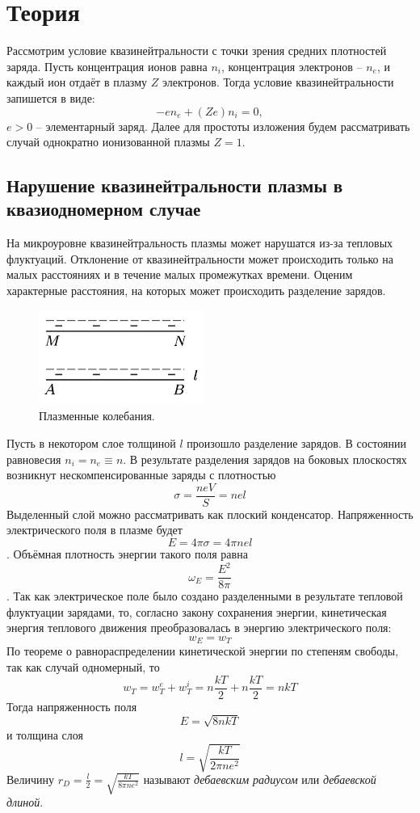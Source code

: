 \section*{Теория}

Рассмотрим условие квазинейтральности с точки зрения средних плотностей заряда. Пусть концентрация ионов равна $n_i$, концентрация электронов -- $n_e$, и каждый ион отдаёт в плазму $Z$ электронов. Тогда условие квазинейтральности запишется в виде:
$$
-en_e + (Ze) n_i = 0, 
$$
$e > 0$ -- элементарный заряд. Далее для простоты изложения будем рассматривать случай однократно ионизованной плазмы $Z = 1$.

\subsection*{Нарушение квазинейтральности плазмы в квазиодномерном случае}

На микроуровне квазинейтральность плазмы может нарушатся из-за тепловых флуктуаций. Отклонение от квазинейтральности может происходить только на малых расстояниях и в течение малых промежутках времени. Оценим характерные расстояния, на которых может происходить разделение зарядов.

\begin{figure}
	\vspace{-10pt}
	\centering
	\includegraphics[width=0.48\textwidth]{../res/plasma.png}
	\caption{Плазменные колебания.}
	\label{img:plasma oscil}
\end{figure}

Пусть в некотором слое толщиной $l$ произошло разделение зарядов. В состоянии равновесия $n_i = n_e \equiv n$. В результате разделения зарядов на боковых плоскостях возникнут нескомпенсированные заряды с плотностью
$$\sigma = \frac{neV}{S} = nel$$
Выделенный слой можно рассматривать как плоский конденсатор. Напряженность электрического поля в плазме будет
$$E = 4\pi \sigma = 4\pi n el$$.
Объёмная плотность энергии такого поля равна
$$\omega_E = \frac{E^2}{8\pi}$$.
Так как электрическое поле было создано разделенными в результате тепловой флуктуации зарядами, то, согласно закону сохранения энергии, кинетическая энергия теплового движения преобразовалась в энергию электрического поля:
$$w_E = w_T$$
По теореме о равнораспределении кинетической энергии по степеням свободы, так как случай одномерный, то
$$
w_T = w_{T}^e + w_{T}^i = n \frac{kT}{2} + n\frac{kT}{2} = nkT
$$
Тогда напряженность поля
$$
E = \sqrt{8nkT}
$$
и толщина слоя
$$
l = \sqrt{\frac{kT}{2\pi n e^2}}
$$
Величину $r_D = \frac{l}{2} = \sqrt{\frac{kT}{8\pi n e^2}}$ называют \textit{дебаевским радиусом} или \textit{дебаевской длиной}. 

